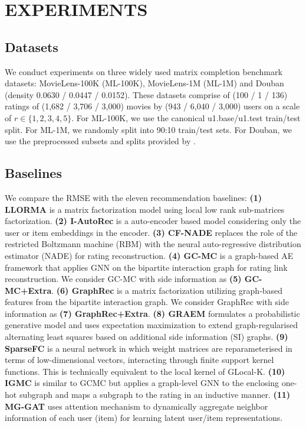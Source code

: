\documentclass[sigconf]{acmart}
\begin{document}
\section{EXPERIMENTS}
\subsection{Datasets}
We conduct experiments on three widely used matrix completion benchmark datasets:  MovieLens-100K (ML-100K), MovieLens-1M (ML-1M) and Douban (density 0.0630 / 0.0447 / 0.0152). These datasets comprise of (\SI{100}{\smallk} / \SI{1}{\million} / \SI{136}{\smallk}) ratings of (1,682 / 3,706 / 3,000) movies by (943 / 6,040 / 3,000) users on a scale of \(r \in \{1, 2, 3, 4, 5\}\). For ML-100K, we use the canonical u1.base/u1.test train/test split. For ML-1M, we randomly split into 90:10 train/test sets. For Douban, we use the preprocessed subsets and splits provided by \citet{monti2017geometric}.



\subsection{Baselines}
We compare the RMSE with the eleven recommendation baselines: \textbf{(1) LLORMA\cite{lee2016llorma} } is a matrix factorization model using local low rank sub-matrices factorization. \textbf{(2) I-AutoRec\cite{sedhain2015autorec}} is a auto-encoder based model considering only the user or item embeddings in the encoder. \textbf{(3) CF-NADE\cite{zheng2016neural}} replaces the role of the restricted Boltzmann machine (RBM) with the neural auto-regressive distribution estimator (NADE) for rating reconstruction. \textbf{(4) GC-MC\cite{berg2018graph}} is a graph-based AE framework that applies GNN on the bipartite interaction graph for rating link reconstruction. We consider GC-MC with side information as \textbf{(5) GC-MC+Extra}. \textbf{(6) GraphRec\cite{rashed2019attribute}} is a matrix factorization utilizing graph-based features from the bipartite interaction graph. We consider GraphRec with side information as \textbf{(7) GraphRec+Extra}. \textbf{(8) GRAEM\cite{strahl2020scalable}} formulates a probabilistic generative model and uses expectation maximization to extend graph-regularised alternating least squares based on additional side information (SI) graphs. \textbf{(9) SparseFC\cite{muller2018kernelized}} is a neural network in which weight matrices are reparameterised in terms of low-dimensional vectors, interacting through finite support kernel functions. This is technically equivalent to the local kernel of GLocal-K. \textbf{(10) IGMC\cite{zhang2019inductive}} is similar to GCMC but applies a graph-level GNN to the enclosing one-hot subgraph and maps a subgraph to the rating in an inductive manner. \textbf{(11) MG-GAT\cite{ugla2020interpretable}} uses attention mechanism to dynamically aggregate neighbor information of each user (item) for learning latent user/item representations.
\end{document}

